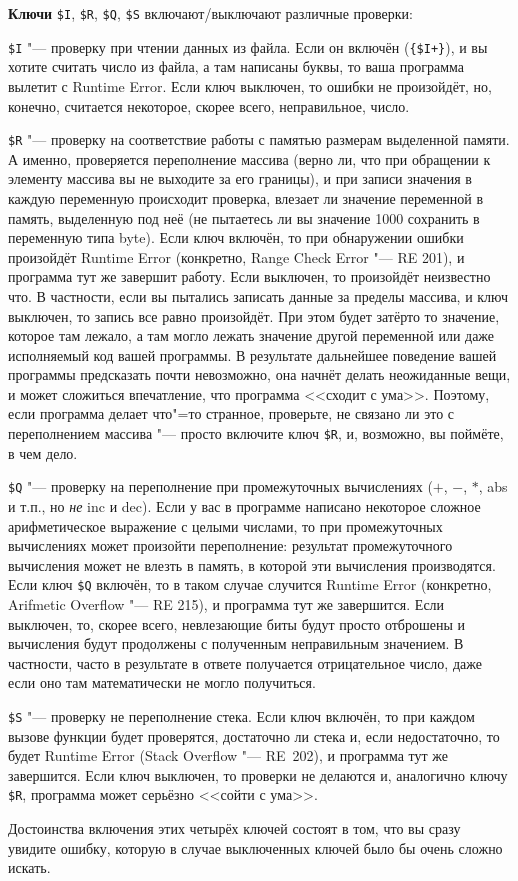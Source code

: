 \textbf{Ключи }\verb|$I|, \verb|$R|, \verb|$Q|, \verb|$S| включают/выключают различные проверки:
\begin{ulist}
\item \verb|$I| "--- проверку при чтении данных из файла. Если он включён (\verb|{$I+}|), и вы 
хотите считать число из файла, а там написаны буквы, то ваша программа вылетит с Runtime Error. 
Если ключ выключен, то ошибки не произойдёт, но, конечно, считается некоторое, скорее всего, 
неправильное, число.
\item \verb|$R| "--- проверку на соответствие работы с памятью размерам выделенной памяти. А 
именно, проверяется переполнение массива (верно ли, что при обращении к элементу массива вы не 
выходите за его границы), и при записи значения в каждую переменную происходит проверка, влезает ли 
значение переменной в память, выделенную под неё (не пытаетесь ли вы значение 1000 сохранить в 
переменную типа byte). Если ключ включён, то при обнаружении ошибки произойдёт Runtime Error 
(конкретно, Range Check Error "--- RE 201),  и программа тут же завершит работу. Если выключен, то 
произойдёт неизвестно что. В частности, если вы пытались записать данные за пределы массива, и ключ 
выключен, то запись все равно произойдёт. При этом будет затёрто то значение, которое там лежало, а 
там могло лежать значение другой переменной или даже исполняемый код вашей программы. В результате 
дальнейшее поведение вашей программы предсказать почти невозможно, она начнёт делать неожиданные 
вещи, и может сложиться впечатление, что программа <<сходит с ума>>. Поэтому, если программа делает 
что"=то странное, проверьте, не связано ли это с переполнением массива "--- просто включите ключ 
\verb|$R|, и, возможно, вы поймёте, в чем дело.
\item \verb|$Q| "--- проверку на переполнение при промежуточных вычислениях ($+$, $-$, $*$, abs и 
т.п., но \textit{не} inc и dec). Если у вас в программе написано некоторое сложное арифметическое 
выражение с целыми числами, то при промежуточных вычислениях может произойти переполнение: 
результат промежуточного вычисления может не влезть в память, в которой эти вычисления 
производятся. Если ключ \verb|$Q| включён, то в таком случае случится Runtime Error (конкретно, 
Arifmetic Overflow "--- RE 215), и программа тут же завершится. Если выключен, то, скорее всего, 
невлезающие биты будут просто отброшены и вычисления будут продолжены с полученным неправильным 
значением. В частности, часто в результате в ответе получается отрицательное число, даже если оно 
там математически не могло получиться.
\item \verb|$S| "--- проверку не переполнение стека. Если ключ включён, то при каждом вызове 
функции будет проверятся, достаточно ли стека и, если недостаточно, то будет Runtime Error (Stack 
Overflow "--- RE~202), и программа тут же завершится. Если ключ выключен, то проверки не делаются 
и, аналогично ключу \verb|$R|, программа может серьёзно <<сойти с ума>>.
\end{ulist}
Достоинства включения этих четырёх ключей состоят в том, что вы сразу увидите ошибку, которую в 
случае выключенных ключей было бы очень сложно искать. 

